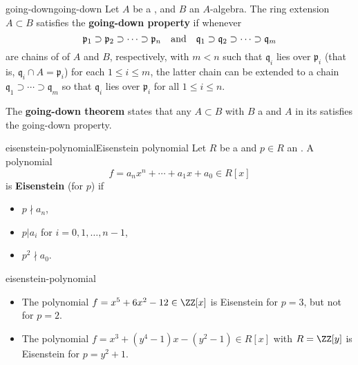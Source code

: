 \begin{topic}{going-down}{going-down}
    Let $A$ be a , and $B$ an $A$-algebra. The ring extension $A \subset B$ satisfies the \textbf{going-down property} if whenever
    \[ \mathfrak{p}_1 \supset \mathfrak{p}_2 \supset \cdots \supset \mathfrak{p}_n \quad \textup{and} \quad \mathfrak{q}_1 \supset \mathfrak{q}_2 \supset \cdots \supset \mathfrak{q}_m \]
    are chains of  of $A$ and $B$, respectively, with $m < n$ such that $\mathfrak{q}_i$ lies over $\mathfrak{p}_i$ (that is, $\mathfrak{q}_i \cap A = \mathfrak{p}_i$) for each $1 \le i \le m$, the latter chain can be extended to a chain $\mathfrak{q}_1 \supset \cdots \supset \mathfrak{q}_m$ so that $\mathfrak{q}_i$ lies over $\mathfrak{p}_i$ for all $1 \le i \le n$.
    
    The \textbf{going-down theorem} states that any  $A \subset B$ with $B$ a  and $A$  in its  satisfies the going-down property.
\end{topic}

\begin{topic}{eisenstein-polynomial}{Eisenstein polynomial}
    Let $R$ be a  and $p \in R$ an . A polynomial
    \[ f = a_n x^n + \cdots + a_1 x + a_0 \in R[x] \]
    is \textbf{Eisenstein} (for $p$) if
    \begin{itemize}
        \item $p \nmid a_n$,
        \item $p | a_i$ for $i = 0, 1, \ldots, n - 1$,
        \item $p^2 \nmid a_0$.
    \end{itemize}
\end{topic}

\begin{example}{eisenstein-polynomial}
    \begin{itemize}
        \item The polynomial $f = x^5 + 6x^2 - 12 \in \ZZ[x]$ is Eisenstein for $p = 3$, but not for $p = 2$.
        \item The polynomial $f = x^3 + (y^4 - 1) x - (y^2 - 1) \in R[x]$ with $R = \ZZ[y]$ is Eisenstein for $p = y^2 + 1$.
    \end{itemize}
\end{example}

